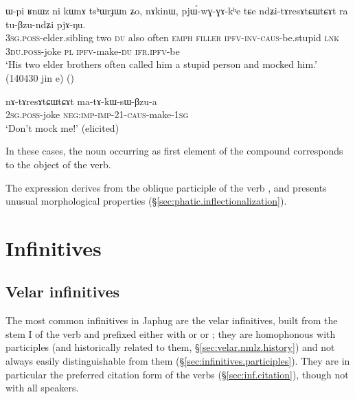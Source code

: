\begin{exe}
\ex \label{ex:ndZitAresAtCWtCAt}
\gll ɯ-pi ʁnɯz ni kɯnɤ tsʰɯrɟɯn ʑo, nɤkinɯ, pjɯ́-wɣ-ɣɤ-kʰe tɕe ndʑi-tɤresɤtɕɯtɕɤt ra tu-βzu-ndʑi pjɤ-ŋu. \\
\textsc{3sg}.\textsc{poss}-elder.sibling two \textsc{du} also often \textsc{emph} \textsc{filler} \textsc{ipfv}-\textsc{inv}-\textsc{caus}-be.stupid \textsc{lnk} \textsc{3du}.\textsc{poss}-joke \textsc{pl} \textsc{ipfv}-make-\textsc{du} \textsc{ifr}.\textsc{ipfv}-be \\
\glt `His two elder brothers often called him a stupid person and mocked him.' (140430 jin e)
()
\end{exe}

\begin{exe}
\ex \label{ex:nAtAresAtCWtCAt}
\gll nɤ-tɤresɤtɕɯtɕɤt ma-tɤ-kɯ-sɯ-βzu-a  \\
\textsc{2sg}.\textsc{poss}-joke \textsc{neg}:\textsc{imp}-\textsc{imp}-2\fl{}1-\textsc{caus}-make-\textsc{1sg} \\
\glt `Don't mock me!' (elicited)
\end{exe}

In these cases, the noun occurring as first element of the compound corresponds to the object of the verb.

The expression  derives from the oblique participle of the verb , and presents unusual morphological properties (§\ref{sec:phatic.inflectionalization}).

 

\section{Infinitives} \label{sec:inf}

 
\subsection{Velar infinitives} \label{sec:velar.inf}
The most common infinitives in Japhug are the velar infinitives, built from the stem I of the verb and prefixed either with  or or ; they are homophonous with participles (and historically related to them, §\ref{sec:velar.nmlz.history}) and not always easily distinguishable from them (§\ref{sec:infinitives.participles}). They are in particular the preferred citation form of the verbs (§\ref{sec:inf.citation}), though not with all speakers.
 
